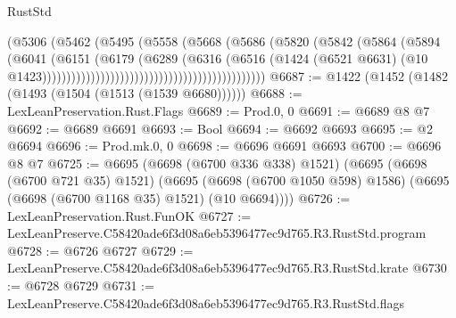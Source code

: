 \begin{lexlean}{RustStd}
\begin{coremodule}
                                                            (@5306
                                                              (@5462
                                                                (@5495
                                                                  (@5558
                                                                    (@5668
                                                                      (@5686
                                                                        (@5820
                                                                          (@5842
                                                                            (@5864
                                                                              (@5894
                                                                                (@6041
                                                                                  (@6151
                                                                                    (@6179
                                                                                      (@6289
                                                                                        (@6316
                                                                                          (@6516
                                                                                            (@1424
                                                                                              (@6521
                                                                                                @6631)
                                                                                              (@10
                                                                                                @1423))))))))))))))))))))))))))))))))))))))))))))))
@6687 := @1422 (@1452 (@1482 (@1493 (@1504 (@1513 (@1539 @6680))))))
@6688 := LexLeanPreservation.Rust.Flags
@6689 := Prod.{0, 0}
@6691 := @6689 @8 @7
@6692 := @6689 @6691
@6693 := Bool
@6694 := @6692 @6693
@6695 := @2 @6694
@6696 := Prod.mk.{0, 0}
@6698 := @6696 @6691 @6693
@6700 := @6696 @8 @7
@6725 := @6695
    (@6698 (@6700 @336 @338) @1521)
    (@6695
      (@6698 (@6700 @721 @35) @1521)
      (@6695 (@6698 (@6700 @1050 @598) @1586) (@6695 (@6698 (@6700 @1168 @35) @1521) (@10 @6694))))
@6726 := LexLeanPreservation.Rust.FunOK
@6727 := LexLeanPreserve.C58420ade6f3d08a6eb5396477ec9d765.R3.RustStd.program
@6728 := @6726 @6727
@6729 := LexLeanPreserve.C58420ade6f3d08a6eb5396477ec9d765.R3.RustStd.krate
@6730 := @6728 @6729
@6731 := LexLeanPreserve.C58420ade6f3d08a6eb5396477ec9d765.R3.RustStd.flags

\end{coremodule}
\end{lexlean}
